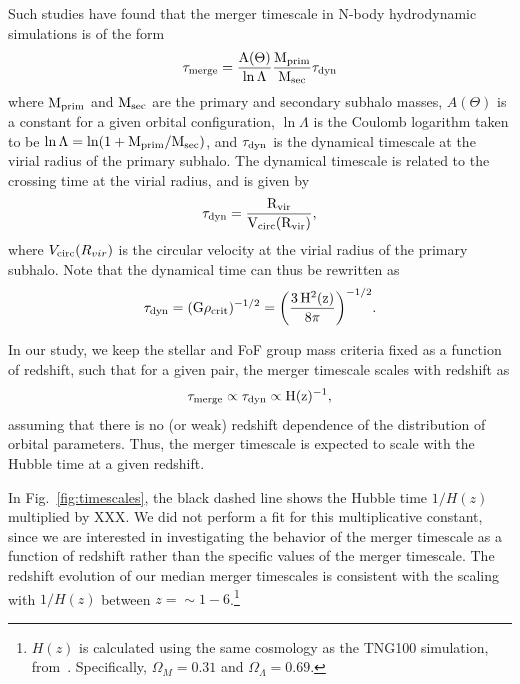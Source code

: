 \documentclass[twocolumn,linenumbers]{aastex631}
\begin{document}
        Such studies have found that the merger timescale in N-body hydrodynamic simulations is of the form
        \begin{equation}
            \rm \tau_{\rm merge} = \frac{A(\Theta)}{\ln \Lambda}\frac{\mprim}{\msec}\tau_{\rm dyn}
        \end{equation}
        where $\rm M_{prim}$ and $\rm M_{sec}$ are the primary and secondary subhalo masses, $A(\Theta)$ is a constant for a given orbital configuration, $\ln\Lambda$ is the Coulomb logarithm taken to be $\ln\Lambda = \ln(1+\rm M_{prim}/\rm M_{sec})$, and $\tau_{\rm dyn}$ is the dynamical timescale at the virial radius of the primary subhalo.
        The dynamical timescale is related to the crossing time at the virial radius, and is given by 
        \begin{equation}
            \rm \tau_{\rm dyn} = \frac{\Rvir}{V_{\rm circ}(\Rvir)},
        \end{equation}
        where $V_{\rm circ}(R_{vir})$ is the circular velocity at the virial radius of the primary subhalo. 
        Note that the dynamical time can thus be rewritten as 
        \begin{equation}
            \rm \tau_{\rm dyn} = (G\rho_{crit})^{-1/2} = \bigg(\frac{3\,H^2(z)}{8\pi}\bigg)^{-1/2}.
        \end{equation}

        In our study, we keep the stellar and FoF group mass criteria fixed as a function of redshift, such that for a given pair, the merger timescale scales with redshift as
        \begin{equation}
            \rm \tau_{merge} \propto \tau_{dyn} \propto H(z)^{-1},
        \end{equation}
        assuming that there is no (or weak) redshift dependence of the distribution of orbital parameters.
        Thus, the merger timescale is expected to scale with the Hubble time at a given redshift. 
        
        In Fig.~\ref{fig:timescales}, the black dashed line shows the Hubble time $1/H(z)$ multiplied by XXX. 
        We did not perform a fit for this multiplicative constant, since we are interested in investigating the behavior of the merger timescale as a function of redshift rather than the specific values of the merger timescale. 
        The redshift evolution of our median merger timescales is consistent with the scaling with $1/H(z)$ between $z=\sim1-6$.\footnote{$H(z)$ is calculated using the same cosmology as the TNG100 simulation, from~\citet{Planck2018}. Specifically, $\Omega_M=0.31$ and $\Omega_{\Lambda}=0.69$.}
        
\end{document}
